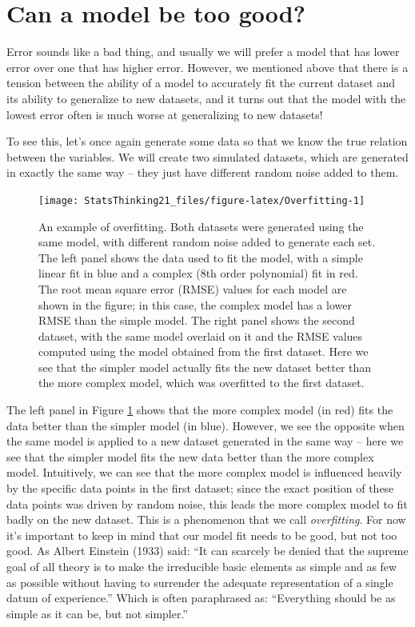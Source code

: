 \documentclass[12pt,]{book}
\theoremstyle{definition}
\theoremstyle{definition}
\theoremstyle{definition}
\theoremstyle{remark}
\begin{document}
\hypertarget{overfitting}{%
\section{Can a model be too good?}\label{overfitting}}

Error sounds like a bad thing, and usually we will prefer a model that has lower error over one that has higher error. However, we mentioned above that there is a tension between the ability of a model to accurately fit the current dataset and its ability to generalize to new datasets, and it turns out that the model with the lowest error often is much worse at generalizing to new datasets!

To see this, let's once again generate some data so that we know the true relation between the variables. We will create two simulated datasets, which are generated in exactly the same way -- they just have different random noise added to them.

\begin{figure}
\texttt{[image: StatsThinking21\_files/figure-latex/Overfitting-1]} \caption{An example of overfitting. Both datasets were generated using the same model, with different random noise added to generate each set.  The left panel shows the data used to fit the model, with a simple linear fit in blue and a complex (8th order polynomial) fit in red.  The root mean square error (RMSE) values for each model are shown in the figure; in this case, the complex model has a lower RMSE than the simple model.  The right panel shows the second dataset, with the same model overlaid on it and the RMSE values computed using the model obtained from the first dataset.  Here we see that the simpler model actually fits the new dataset better than the more complex model, which was overfitted to the first dataset.}\label{fig:Overfitting}
\end{figure}

The left panel in Figure \ref{fig:Overfitting} shows that the more complex model (in red) fits the data better than the simpler model (in blue). However, we see the opposite when the same model is applied to a new dataset generated in the same way -- here we see that the simpler model fits the new data better than the more complex model. Intuitively, we can see that the more complex model is influenced heavily by the specific data points in the first dataset; since the exact position of these data points was driven by random noise, this leads the more complex model to fit badly on the new dataset. This is a phenomenon that we call \emph{overfitting}. For now it's important to keep in mind that our model fit needs to be good, but not too good. As Albert Einstein (1933) said: ``It can scarcely be denied that the supreme goal of all theory is to make the irreducible basic elements as simple and as few as possible without having to surrender the adequate representation of a single datum of experience.'' Which is often paraphrased as: ``Everything should be as simple as it can be, but not simpler.''
\end{document}
